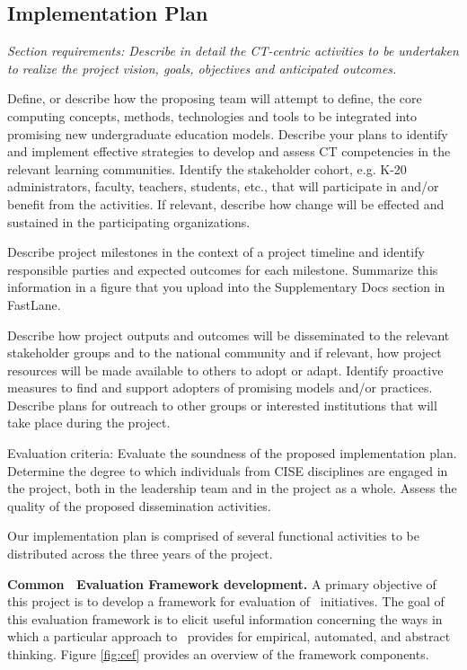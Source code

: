 \subsection{Implementation Plan}
\label{sec:implementation}

{\em Section requirements: Describe in detail the CT-centric activities to
be undertaken to realize the project vision, goals, objectives and
anticipated outcomes.

Define, or describe how the proposing team will attempt to define, the core
computing concepts, methods, technologies and tools to be integrated into
promising new undergraduate education models.  Describe your plans to
identify and implement effective strategies to develop and assess CT
competencies in the relevant learning communities.  Identify the
stakeholder cohort, e.g. K-20 administrators, faculty, teachers, students,
etc., that will participate in and/or benefit from the activities. If
relevant, describe how change will be effected and sustained in the
participating organizations.

Describe project milestones in the context of a project timeline and
identify responsible parties and expected outcomes for each milestone.
Summarize this information in a figure that you upload into the
Supplementary Docs section in FastLane.

Describe how project outputs and outcomes will be disseminated to the
relevant stakeholder groups and to the national community and if relevant,
how project resources will be made available to others to adopt or
adapt. Identify proactive measures to find and support adopters of
promising models and/or practices. Describe plans for outreach to other
groups or interested institutions that will take place during the project.

Evaluation criteria: Evaluate the soundness of the proposed implementation
plan.  Determine the degree to which individuals from CISE disciplines are
engaged in the project, both in the leadership team and in the project as a
whole.  Assess the quality of the proposed dissemination activities.
}
\bigskip

Our implementation plan is comprised of several functional activities to be
distributed across the three years of the project.

{\bf Common \eCT\ Evaluation Framework development.}  A primary objective
of this project is to develop a framework for evaluation of \eCT\
initiatives.  The goal of this evaluation framework is to elicit useful
information concerning the ways in which a particular approach to \eCT\
provides for empirical, automated, and abstract thinking. Figure
\ref{fig:cef} provides an overview of the framework components.

